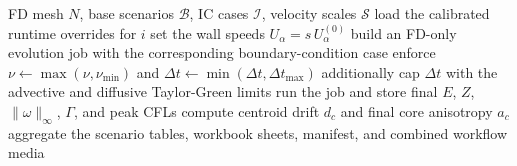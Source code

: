 \documentclass[11pt]{article}
\begin{document}
\begin{algorithm}[t]
\caption{Phase 2 boundary-condition workflow}
\begin{algorithmic}[1]
\Require FD mesh $N$, base scenarios $\mathcal{B}$, IC cases $\mathcal{I}$, velocity scales $\mathcal{S}$
    \State load the calibrated runtime overrides for $i$
            \State set the wall speeds $U_{\alpha} = s\,U_{\alpha}^{(0)}$
            \State build an FD-only evolution job with the corresponding boundary-condition case
            \State enforce $\nu \leftarrow \max(\nu,\nu_{\min})$ and $\Delta t \leftarrow \min(\Delta t,\Delta t_{\max})$
                \State additionally cap $\Delta t$ with the advective and diffusive Taylor-Green limits
            \EndIf
            \State run the job and store final $E$, $Z$, $\|\omega\|_{\infty}$, $\Gamma$, and peak CFLs
            \State compute centroid drift $d_c$ and final core anisotropy $a_c$
        \EndFor
    \EndFor
\EndFor
\State aggregate the scenario tables, workbook sheets, manifest, and combined workflow media
\end{algorithmic}
\end{algorithm}
\end{document}
